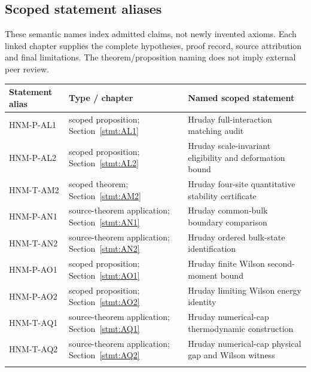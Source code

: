 \subsection{Scoped statement aliases}
These semantic names index admitted claims, not newly invented axioms. Each linked chapter supplies the complete hypotheses, proof record, source attribution and final limitations. The theorem/proposition naming does not imply external peer review.
\begingroup\small\setlength{\tabcolsep}{4pt}
\begin{longtable}{@{}p{32mm}p{36mm}p{80mm}@{}}
\toprule Statement alias & Type / chapter & Named scoped statement\\\midrule\endhead
HNM-P-AL1 & scoped proposition; Section~\ref{stmt:AL1} & Hruday full-interaction matching audit\\\addlinespace
HNM-P-AL2 & scoped proposition; Section~\ref{stmt:AL2} & Hruday scale-invariant eligibility and deformation bound\\\addlinespace
HNM-T-AM2 & scoped theorem; Section~\ref{stmt:AM2} & Hruday four-site quantitative stability certificate\\\addlinespace
HNM-P-AN1 & source-theorem application; Section~\ref{stmt:AN1} & Hruday common-bulk boundary comparison\\\addlinespace
HNM-T-AN2 & source-theorem application; Section~\ref{stmt:AN2} & Hruday ordered bulk-state identification\\\addlinespace
HNM-P-AO1 & scoped proposition; Section~\ref{stmt:AO1} & Hruday finite Wilson second-moment bound\\\addlinespace
HNM-P-AO2 & scoped proposition; Section~\ref{stmt:AO2} & Hruday limiting Wilson energy identity\\\addlinespace
HNM-T-AQ1 & source-theorem application; Section~\ref{stmt:AQ1} & Hruday numerical-cap thermodynamic construction\\\addlinespace
HNM-T-AQ2 & source-theorem application; Section~\ref{stmt:AQ2} & Hruday numerical-cap physical gap and Wilson witness\\\addlinespace
\bottomrule\end{longtable}\endgroup
